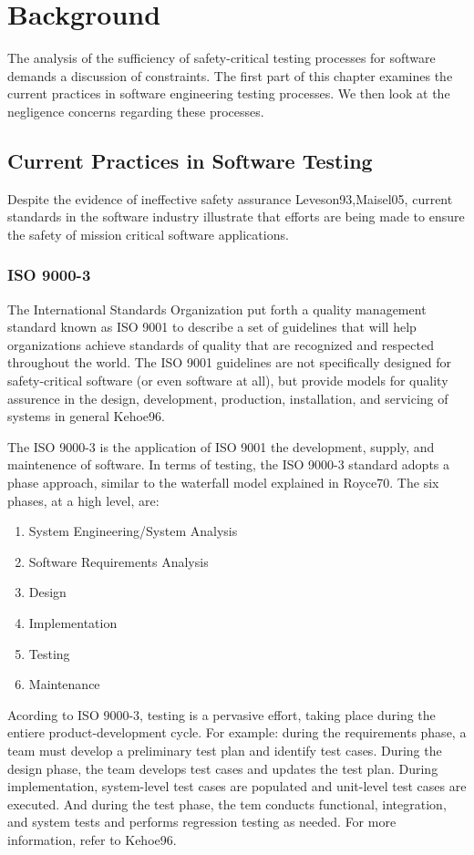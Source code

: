 \chapter{Background}\label{C:Background}
The analysis of the sufficiency of safety-critical testing processes for
software demands a discussion of constraints. The first part of this chapter
examines the current practices in software engineering testing processes. We
then look at the negligence concerns regarding these processes.

\section{Current Practices in Software Testing}
Despite the evidence of ineffective safety assurance \cite{refs}{Leveson93,Maisel05},
current standards in the software industry illustrate that efforts are being
made to ensure the safety of mission critical software applications.


\subsection{ISO 9000-3}
The International Standards Organization put forth a quality management standard
known as ISO 9001 to describe a set of guidelines that will help organizations
achieve standards of quality that are recognized and respected throughout the
world. The ISO 9001 guidelines are not specifically designed for safety-critical
software (or even software at all), but provide models for quality assurence
in the design, development, production, installation, and servicing of systems
in general \cite{refs}{Kehoe96}.

The ISO 9000-3 is the application of ISO 9001 the development, supply, and
maintenence of software. In terms of testing, the ISO 9000-3 standard adopts a
phase approach, similar to the waterfall model explained in \cite{refs}{Royce70}. The
six phases, at a high level, are:
\singlespace
\begin{enumerate}
  \item System Engineering/System Analysis
  \item Software Requirements Analysis
  \item Design
  \item Implementation
  \item Testing
  \item Maintenance
\end{enumerate}
\doublespace
Acording to ISO 9000-3, testing is a pervasive effort, taking place during the
entiere product-development cycle. For example: during the requirements phase, a
team must develop a preliminary test plan and identify test cases. During the
design phase, the team develops test cases and updates the test plan. During
implementation, system-level test cases are populated and unit-level test cases
are executed. And during the test phase, the tem conducts functional,
integration, and system tests and performs regression testing as needed. For
more information, refer to \cite{refs}{Kehoe96}.

